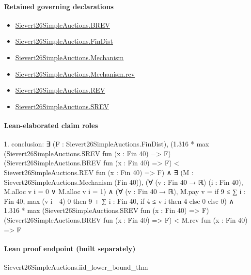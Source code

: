 \documentclass[10pt]{article}
\begin{document}
\paragraph{Retained governing declarations}
\begin{itemize}\raggedright
\item \hyperlink{paper-prerequisite-e0c4e0f254386cff}{Sievert26\allowbreak{}Simple\allowbreak{}Auctions.\allowbreak{}BREV}
\item \hyperlink{paper-prerequisite-5b39ea21863ce14e}{Sievert26\allowbreak{}Simple\allowbreak{}Auctions.\allowbreak{}Fin\allowbreak{}Dist}
\item \hyperlink{paper-prerequisite-b1d558d0810cbb0e}{Sievert26\allowbreak{}Simple\allowbreak{}Auctions.\allowbreak{}Mechanism}
\item \hyperlink{governing-declaration-8a7d9cf1128641b7}{Sievert26\allowbreak{}Simple\allowbreak{}Auctions.\allowbreak{}Mechanism.\allowbreak{}rev}
\item \hyperlink{paper-prerequisite-8bbfb5082359244f}{Sievert26\allowbreak{}Simple\allowbreak{}Auctions.\allowbreak{}REV}
\item \hyperlink{paper-prerequisite-de82ecb4c67c171b}{Sievert26\allowbreak{}Simple\allowbreak{}Auctions.\allowbreak{}SREV}
\end{itemize}
\paragraph{Lean-elaborated claim roles}\begin{ReviewVerbatim}
1. conclusion: ∃ (F : Sievert26SimpleAuctions.FinDist),
  (1.316 *
        max (Sievert26SimpleAuctions.SREV fun (x : Fin 40) => F) (Sievert26SimpleAuctions.BREV fun (x : Fin 40) => F) <
      Sievert26SimpleAuctions.REV fun (x : Fin 40) => F) ∧
    ∃ (M : Sievert26SimpleAuctions.Mechanism (Fin 40)),
      (∀ (v : Fin 40 → ℝ) (i : Fin 40), M.alloc v i = 0 ∨ M.alloc v i = 1) ∧
        (∀ (v : Fin 40 → ℝ),
            M.pay v = if 9 ≤ ∑ i : Fin 40, max (v i - 4) 0 then 9 + ∑ i : Fin 40, if 4 ≤ v i then 4 else 0 else 0) ∧
          1.316 *
              max (Sievert26SimpleAuctions.SREV fun (x : Fin 40) => F)
                (Sievert26SimpleAuctions.BREV fun (x : Fin 40) => F) <
            M.rev fun (x : Fin 40) => F
\end{ReviewVerbatim}

\paragraph{Lean proof endpoint (built separately)}\begin{ReviewVerbatim}
Sievert26SimpleAuctions.iid_lower_bound_thm
\end{ReviewVerbatim}
\end{document}
